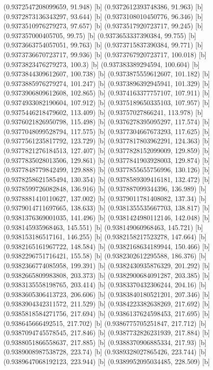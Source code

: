 {{{(0.9372547208099659, 91.948) [b] 
(0.9372612393748386, 91.963) [b] 
(0.9372873136343297, 93.644) [b] 
(0.9373108010450776, 96.346) [b] 
(0.9373510976279273, 97.657) [b] 
(0.9373517920723717, 99.245) [b] 
(0.937357000405705, 99.75) [b] 
(0.9373653337390384, 99.755) [b] 
(0.9373663754057051, 99.763) [b] 
(0.9373715837390384, 99.771) [b] 
(0.9373736670723717, 99.936) [b] 
(0.9373767920723717, 100.018) [b] 
(0.9373823476279273, 100.3) [b] 
(0.937383389294594, 100.604) [b] 
(0.9373844309612607, 100.738) [b] 
(0.9373875559612607, 101.182) [b] 
(0.9373885976279274, 101.247) [b] 
(0.9373896392945941, 101.329) [b] 
(0.9373906809612608, 102.865) [b] 
(0.9374163377757107, 107.911) [b] 
(0.9374933082190604, 107.912) [b] 
(0.9375189650335103, 107.957) [b] 
(0.9375446218479602, 113.409) [b] 
(0.93757027866241, 113.978) [b] 
(0.9376021826950798, 115.498) [b] 
(0.9376278395095297, 117.574) [b] 
(0.9377048099528794, 117.575) [b] 
(0.9377304667673293, 117.625) [b] 
(0.9377561235817792, 123.729) [b] 
(0.9377817803962291, 124.363) [b] 
(0.9377821276184513, 127.407) [b] 
(0.9377828152099009, 129.859) [b] 
(0.9377835028013506, 129.861) [b] 
(0.9377841903928003, 129.874) [b] 
(0.9377848779842499, 129.888) [b] 
(0.9377855655756996, 130.126) [b] 
(0.9378258621585494, 130.354) [b] 
(0.9378589309416181, 132.472) [b] 
(0.9378599726082848, 136.916) [b] 
(0.937887099344396, 136.989) [b] 
(0.9378881410110627, 137.002) [b] 
(0.9379011781408082, 137.34) [b] 
(0.9379014711697665, 138.633) [b] 
(0.9381355535667703, 138.817) [b] 
(0.9381376369001035, 141.496) [b] 
(0.9381424980112146, 142.048) [b] 
(0.938145935968463, 145.551) [b] 
(0.938149060968463, 145.721) [b] 
(0.938153186517161, 146.255) [b] 
(0.9382158217523278, 147.664) [b] 
(0.9382165161967722, 148.584) [b] 
(0.9382168634189944, 150.466) [b] 
(0.9382296751716421, 155.58) [b] 
(0.9382302612295588, 186.376) [b] 
(0.9382366774085958, 199.391) [b] 
(0.9382430935876329, 201.292) [b] 
(0.9382665809983808, 203.373) [b] 
(0.9382900684091287, 203.385) [b] 
(0.9383135558198765, 203.414) [b] 
(0.9383370432306244, 204.16) [b] 
(0.9383605306413723, 206.606) [b] 
(0.9383840180521201, 207.346) [b] 
(0.9383904342311572, 211.529) [b] 
(0.9384223382638269, 217.692) [b] 
(0.9385818584271756, 217.694) [b] 
(0.9386137624598453, 217.695) [b] 
(0.938645666492515, 217.702) [b] 
(0.9386775705251847, 217.712) [b] 
(0.9387094745578545, 217.846) [b] 
(0.9387732826231939, 217.884) [b] 
(0.9388051866558637, 217.885) [b] 
(0.9388370906885334, 217.93) [b] 
(0.9389008987538728, 223.74) [b] 
(0.9389328027865426, 223.744) [b] 
(0.9389647068192123, 223.944) [b] 
(0.9389952095034485, 228.509) [b] 
}}}
